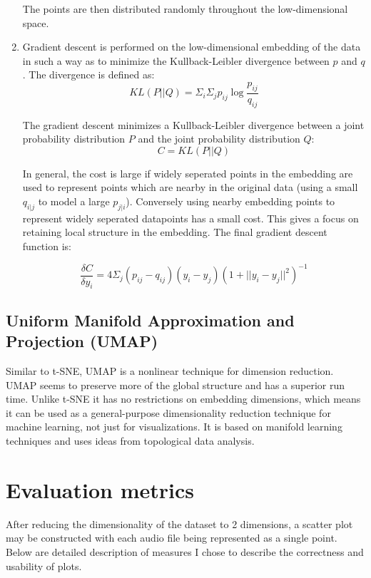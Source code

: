 \documentclass[a4paper, 12pt, twoside]{report}
\begin{document}
\begin{enumerate}
    The points are then distributed randomly throughout the low-dimensional space.

    \item Gradient descent is performed on the low-dimensional embedding of the data in such a way as to minimize the Kullback-Leibler divergence between $p$ and $q$. The divergence is defined as:
    \[ KL(P || Q) = \Sigma_{i}\Sigma_{j}p_{ij}\log \frac{p_{ij}}{q_{ij}} \]

    The gradient descent minimizes a Kullback-Leibler divergence between a joint probability distribution $P$ and the joint probability distribution $Q$:
    \[ C = KL(P||Q)\]

    In general, the cost is large if widely seperated points in the embedding are used to represent points which are nearby in the original data (using a small $q_{i|j}$ to model a large $p_{j|i}$). Conversely using nearby embedding points to represent widely seperated datapoints has a small cost. This gives a focus on retaining local structure in the embedding. The final gradient descent function is:

    \[ \frac{\delta C}{\delta y_{i}} = 4 \Sigma_{j}(p_{ij} - q_{ij})(y_{i} - y_{j})(1 + ||y_{i} - y_{j}||^{2})^{-1} \]

\end{enumerate}

\subsection{Uniform Manifold Approximation and Projection (UMAP)}
\label{sec:org6a758a8}
Similar to t-SNE, UMAP is a nonlinear technique for dimension reduction. UMAP seems to preserve more of the global structure and has a superior run time. Unlike t-SNE it has no restrictions on embedding dimensions, which means it can be used as a general-purpose dimensionality reduction technique for machine learning, not just for visualizations. It is based on manifold learning techniques and uses ideas from topological data analysis.


\section{Evaluation metrics}
\label{sec:org078e27c}

After reducing the dimensionality of the dataset to 2 dimensions, a scatter plot may be constructed with each audio file being represented as a single point. Below are detailed description of measures I chose to describe the correctness and usability of plots.
\end{document}
